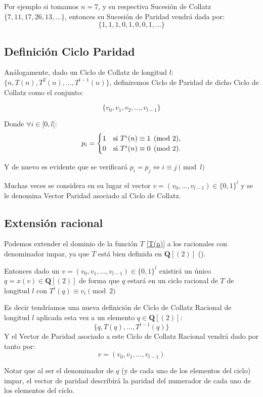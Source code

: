 Por ejemplo si tomamos $n=7$, y su respectiva Sucesión de Collatz $\{7, 11, 17, 26, 13, ... \}$, entonces su Sucesión de Paridad vendrá dada por:
$$\{ 1, 1, 1, 0, 1, 0, 0, 1,... \}$$

\subsection{Definición Ciclo Paridad}
Análogamente, dado un Ciclo de Collatz de longitud $l$: $\{ n, T(n), T^2(n), ..., T^{l-1}(n)\}$, definiremos Ciclo de Paridad de dicho Ciclo de Collatz como el conjunto:

$$
    \{ v_0, v_1, v_2, ..., v_{l-1}\}
$$

Donde $\forall i \in [0,l[$:
$$
    p_i = \begin{cases}
    1 & \text{si \ensuremath{T^i(n)\equiv1\pmod2}},\\
    0 & \text{si \ensuremath{T^i(n)\equiv0\pmod2}.}
    \end{cases}
$$

Y de nuevo es evidente que se verificará $p_i = p_j \Longleftrightarrow i \equiv j \pmod l$

Muchas veces se considera en su lugar el vector $v=(v_0, ..., v_{l-1}) \in \{0,1\}^l$ y se le denomina Vector Paridad asociado al Ciclo de Collatz.

\subsection{Extensión racional}
Podemos extender el dominio de la función $T$ \ref{T(n)} a los racionales con denominador impar, ya que $T$ está bien definida en $\mathbf{Q}[(2)]$ (\cite{Lagarias1990}).

Entonces dado un $v=(v_0, v_1, ..., v_{l-1}) \in \{0, 1\}^l$ existirá un único $q=x(v)\in\mathbf{Q}[(2)]$ de forma que $q$ estará en un ciclo racional de $T$ de longitud $l$ con $T^i(q) \equiv v_i \pmod{2}$

Es decir tendríamos una nueva definición de Ciclo de Collatz Racional de longitud $l$ aplicada esta vez a un elemento $q \in \mathbf{Q}[(2)]$:
$$\{ q, T(q), ..., T^{l-1}(q)\}$$
Y el Vector de Paridad asociado a este Ciclo de Collatz Racional vendrá dado por tanto por:
$$v = (v_0, v_1, ..., v_{l-1})$$ 

Notar que al ser el denominador de $q$ (y de cada uno de los elementos del ciclo) impar, el vector de paridad describirá la paridad del numerador de cada uno de los elementos del ciclo.

